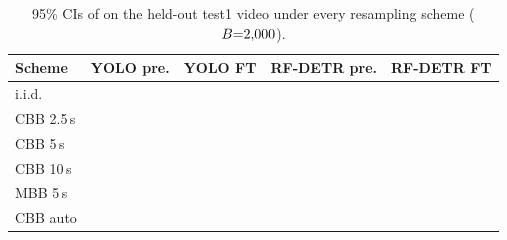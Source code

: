 \begin{table}[!htbp]
\centering
\caption{95\% CIs of \AP{} on the held-out test1 video under every resampling scheme ($B{=}2{,}000$).}
\label{tab:ci_ho}
\scriptsize\setlength{\tabcolsep}{1.5pt}
\begin{tabular}{lcccc}
\toprule
Scheme & YOLO pre. & YOLO FT & RF-DETR pre. & RF-DETR FT \\
\midrule
i.i.d. & \ci{\TcHoIidYoloPtLo}{\TcHoIidYoloPtHi} & \ci{\TcHoIidYoloFtLo}{\TcHoIidYoloFtHi} & \ci{\TcHoIidRfPtLo}{\TcHoIidRfPtHi} & \ci{\TcHoIidRfFtLo}{\TcHoIidRfFtHi} \\
CBB 2.5\,s & \ci{\TcHoCbbAYoloPtLo}{\TcHoCbbAYoloPtHi} & \ci{\TcHoCbbAYoloFtLo}{\TcHoCbbAYoloFtHi} & \ci{\TcHoCbbARfPtLo}{\TcHoCbbARfPtHi} & \ci{\TcHoCbbARfFtLo}{\TcHoCbbARfFtHi} \\
CBB 5\,s & \ci{\TcHoCbbBYoloPtLo}{\TcHoCbbBYoloPtHi} & \ci{\TcHoCbbBYoloFtLo}{\TcHoCbbBYoloFtHi} & \ci{\TcHoCbbBRfPtLo}{\TcHoCbbBRfPtHi} & \ci{\TcHoCbbBRfFtLo}{\TcHoCbbBRfFtHi} \\
CBB 10\,s & \ci{\TcHoCbbCYoloPtLo}{\TcHoCbbCYoloPtHi} & \ci{\TcHoCbbCYoloFtLo}{\TcHoCbbCYoloFtHi} & \ci{\TcHoCbbCRfPtLo}{\TcHoCbbCRfPtHi} & \ci{\TcHoCbbCRfFtLo}{\TcHoCbbCRfFtHi} \\
MBB 5\,s & \ci{\TcHoMbbBYoloPtLo}{\TcHoMbbBYoloPtHi} & \ci{\TcHoMbbBYoloFtLo}{\TcHoMbbBYoloFtHi} & \ci{\TcHoMbbBRfPtLo}{\TcHoMbbBRfPtHi} & \ci{\TcHoMbbBRfFtLo}{\TcHoMbbBRfFtHi} \\
CBB auto & \ci{\TcHoCbbAutoYoloPtLo}{\TcHoCbbAutoYoloPtHi} & \ci{\TcHoCbbAutoYoloFtLo}{\TcHoCbbAutoYoloFtHi} & \ci{\TcHoCbbAutoRfPtLo}{\TcHoCbbAutoRfPtHi} & \ci{\TcHoCbbAutoRfFtLo}{\TcHoCbbAutoRfFtHi} \\
\bottomrule
\end{tabular}
\end{table}
